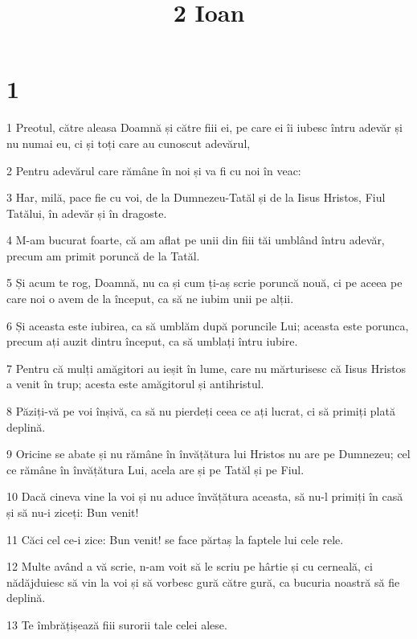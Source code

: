 

\title{2 Ioan}


\chapter{1}

\par 1 Preotul, către aleasa Doamnă și către fiii ei, pe care ei îi iubesc întru adevăr și nu numai eu, ci și toți care au cunoscut adevărul,
\par 2 Pentru adevărul care rămâne în noi și va fi cu noi în veac:
\par 3 Har, milă, pace fie cu voi, de la Dumnezeu-Tatăl și de la Iisus Hristos, Fiul Tatălui, în adevăr și în dragoste.
\par 4 M-am bucurat foarte, că am aflat pe unii din fiii tăi umblând întru adevăr, precum am primit poruncă de la Tatăl.
\par 5 Și acum te rog, Doamnă, nu ca și cum ți-aș scrie poruncă nouă, ci pe aceea pe care noi o avem de la început, ca să ne iubim unii pe alții.
\par 6 Și aceasta este iubirea, ca să umblăm după poruncile Lui; aceasta este porunca, precum ați auzit dintru început, ca să umblați întru iubire.
\par 7 Pentru că mulți amăgitori au ieșit în lume, care nu mărturisesc că Iisus Hristos a venit în trup; acesta este amăgitorul și antihristul.
\par 8 Păziți-vă pe voi înșivă, ca să nu pierdeți ceea ce ați lucrat, ci să primiți plată deplină.
\par 9 Oricine se abate și nu rămâne în învățătura lui Hristos nu are pe Dumnezeu; cel ce rămâne în învățătura Lui, acela are și pe Tatăl și pe Fiul.
\par 10 Dacă cineva vine la voi și nu aduce învățătura aceasta, să nu-l primiți în casă și să nu-i ziceți: Bun venit!
\par 11 Căci cel ce-i zice: Bun venit! se face părtaș la faptele lui cele rele.
\par 12 Multe având a vă scrie, n-am voit să le scriu pe hârtie și cu cerneală, ci nădăjduiesc să vin la voi și să vorbesc gură către gură, ca bucuria noastră să fie deplină.
\par 13 Te îmbrățișează fiii surorii tale celei alese.


